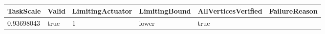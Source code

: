 \begin{tabular}{@{}llllll@{}}
\toprule
TaskScale & Valid & LimitingActuator & LimitingBound & AllVerticesVerified & FailureReason \\
\midrule
0.93698043 & true & 1 & lower & true &  \\
\bottomrule
\end{tabular}
